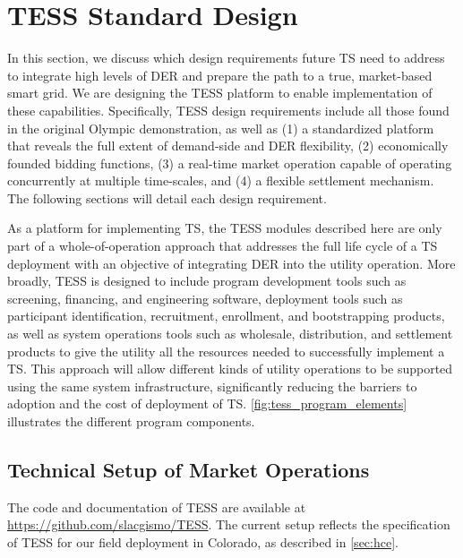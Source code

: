 \section{TESS Standard Design}\label{sec:standard_design}

In this section, we discuss which design requirements future TS need to address to integrate high levels of DER and prepare the path to a true, market-based smart grid.
We are designing the TESS platform to enable implementation of these capabilities.
Specifically, TESS design requirements include all those found in the original Olympic demonstration, as well as (1) a standardized platform that reveals the full extent of demand-side and DER flexibility, (2) economically founded bidding functions, (3) a real-time market operation capable of operating concurrently at multiple time-scales, and (4) a flexible settlement mechanism. The following sections will detail each design requirement.



As a platform for implementing TS, the TESS modules described here are only part of a whole-of-operation approach that addresses the full life cycle of a TS deployment with an objective of integrating DER into the utility operation.  
More broadly, TESS is designed to include program development tools such as screening, financing, and engineering software, deployment tools such as participant identification, recruitment, enrollment, and bootstrapping products, as well as system operations tools such as wholesale, distribution, and settlement products to give the utility all the resources needed to successfully implement a TS.
This approach will allow different kinds of utility operations to be supported using the same system infrastructure, significantly reducing the barriers to adoption and the cost of deployment of TS. 
\cref{fig:tess_program_elements} illustrates the different program components.

\subsection{Technical Setup of Market Operations}\label{sec:technical_setup}

The code and documentation of TESS are available at \url{https://github.com/slacgismo/TESS}. The current setup reflects the specification of TESS for our field deployment in Colorado, as described in \cref{sec:hce}.

